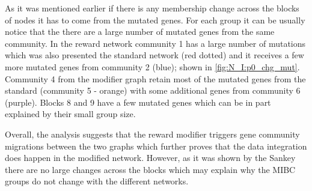 As it was mentioned earlier if there is any membership change across the blocks of nodes it has to come from the mutated genes. For each group it can be usually notice that the there are a large number of mutated genes from the same community. In the reward network community 1 has a large number of mutations which was also presented the standard network (red dotted) and it receives a few more mutated genes from community 2 (blue); shown in \cref{fig:N_I:p0_chg_mut}. Community 4 from the modifier graph retain most of the mutated genes from the standard (community 5 - orange) with some additional genes from community 6 (purple). Blocks 8 and 9 have a few mutated genes which can be in part explained by their small group size. 

Overall, the analysis suggests that the reward modifier triggers gene community migrations between the two graphs which further proves that the data integration does happen in the modified network. However, as it was shown by the Sankey there are no large changes across the blocks which may explain why the MIBC groups do not change with the different networks.


